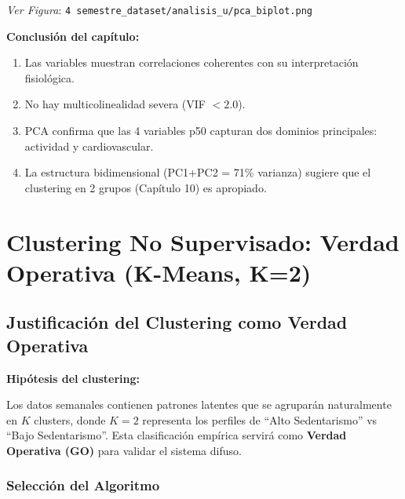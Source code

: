 \documentclass[12pt,letterpaper,twoside]{report}
\begin{document}
\textit{Ver Figura}: \texttt{4 semestre\_dataset/analisis\_u/pca\_biplot.png}

\begin{conclusionbox}
\textbf{Conclusión del capítulo:}

\begin{enumerate}[noitemsep]
    \item Las variables muestran correlaciones coherentes con su interpretación fisiológica.
    \item No hay multicolinealidad severa (VIF $< 2.0$).
    \item PCA confirma que las 4 variables p50 capturan dos dominios principales: actividad y cardiovascular.
    \item La estructura bidimensional (PC1+PC2 = 71\% varianza) sugiere que el clustering en 2 grupos (Capítulo 10) es apropiado.
\end{enumerate}
\end{conclusionbox}

\chapter{Clustering No Supervisado: Verdad Operativa (K-Means, K=2)}

\section{Justificación del Clustering como Verdad Operativa}

\begin{hipotesisbox}
\textbf{Hipótesis del clustering:}

Los datos semanales contienen patrones latentes que se agruparán naturalmente en $K$ clusters, donde $K=2$ representa los perfiles de ``Alto Sedentarismo'' vs ``Bajo Sedentarismo''. Esta clasificación empírica servirá como \textbf{Verdad Operativa (GO)} para validar el sistema difuso.
\end{hipotesisbox}

\subsection{Selección del Algoritmo}
\end{document}
